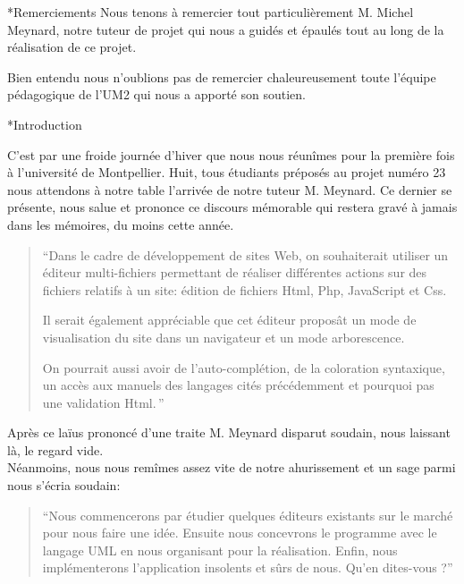 \documentclass[a4paper, 12pt]{report}
\begin{document}
	\begin{chapter}*{Remerciements}
	Nous tenons à remercier tout particulièrement M. Michel Meynard, notre tuteur de projet qui nous a guidés et épaulés tout au long de la réalisation de ce projet. 

	Bien entendu nous n'oublions pas de remercier chaleureusement toute l'équipe pédagogique de l'UM2 qui nous a apporté son soutien.
	\end{chapter} 
	\tableofcontents
	\begin{chapter}*{Introduction}
	C'est par une froide journée d'hiver que nous nous réunîmes pour la première fois à l'université de Montpellier. 
	Huit, tous étudiants préposés au projet numéro 23 nous attendons à notre table l'arrivée de notre tuteur M. Meynard. 
	Ce dernier se présente, nous salue et prononce ce discours mémorable qui restera gravé à jamais dans les mémoires, du moins cette année.\\
	\begin{quotation}
		``Dans le cadre de développement de sites Web, on souhaiterait utiliser un éditeur multi-fichiers permettant de réaliser différentes actions sur
		des fichiers relatifs à un site: édition de fichiers Html, Php, JavaScript et Css.

		Il serait également appréciable que cet éditeur proposât un mode de visualisation du site dans un navigateur et un mode arborescence.

		On pourrait aussi avoir de l'\gls{auto-complétion}, de la coloration syntaxique, un accès aux manuels des langages cités précédemment et pourquoi
		pas une validation Html.\,''
	\end{quotation}

	Après ce laïus prononcé d'une traite M. Meynard disparut soudain, nous laissant là, le regard vide.\\


	Néanmoins, nous nous remîmes assez vite de notre ahurissement et un sage parmi nous s'écria soudain:
	\begin{quotation}
		``Nous commencerons par étudier quelques éditeurs existants sur le marché pour nous faire une idée. Ensuite nous concevrons
		le programme avec le langage UML en nous organisant pour la réalisation.
		Enfin, nous implémenterons l'application insolents et sûrs de nous.	Qu'en dites-vous ?''
	\end{quotation}


\end{chapter}
\end{document}
